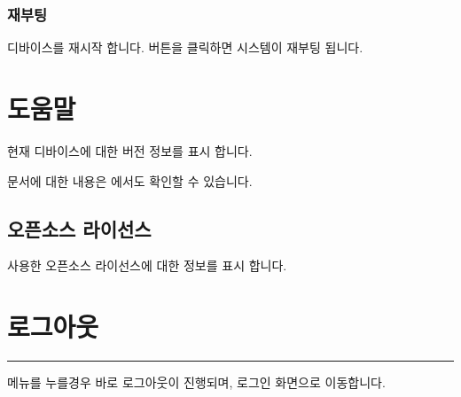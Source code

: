 \documentclass[letterpaper,10pt,english]{sphinxmanual}
\begin{document}
\subsubsection{재부팅}
\label{\detokenize{main_menu/system:id11}}
\noindent{}

\sphinxAtStartPar
디바이스를 재시작 합니다.  버튼을 클릭하면 시스템이 재부팅 됩니다.

\sphinxstepscope


\section{도움말}
\label{\detokenize{main_menu/help:id1}}\label{\detokenize{main_menu/help::doc}}
\noindent{}

\sphinxAtStartPar
현재 디바이스에 대한 버전 정보를 표시 합니다.

\sphinxAtStartPar
문서에 대한 내용은  에서도 확인할 수 있습니다.


\subsection{오픈소스 라이선스}
\label{\detokenize{main_menu/help:id2}}
\noindent{}

\sphinxAtStartPar
사용한 오픈소스 라이선스에 대한 정보를 표시 합니다.

\sphinxstepscope


\section{로그아웃}
\label{\detokenize{main_menu/logout:id1}}\label{\detokenize{main_menu/logout::doc}}

\bigskip\hrule\bigskip


\sphinxAtStartPar
{} 메뉴를 누를경우 바로 로그아웃이 진행되며, 로그인 화면으로 이동합니다.



\renewcommand{\indexname}{색인}
\printindex
\end{document}
